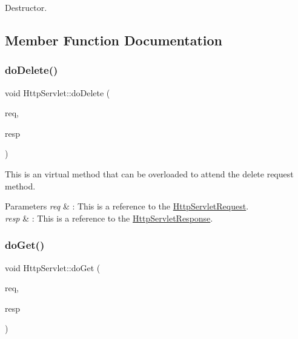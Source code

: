 Destructor. 



\subsection{Member Function Documentation}
\mbox{\label{class_http_servlet_a773a855260ff0977ae4c4a861008092c}} 
\subsubsection{\texorpdfstring{do\+Delete()}{doDelete()}}
{\footnotesize\ttfamily void Http\+Servlet\+::do\+Delete (\begin{DoxyParamCaption}\item[{\hyperlink{class_http_servlet_request}{Http\+Servlet\+Request} \&}]{req,  }\item[{\hyperlink{class_http_servlet_response}{Http\+Servlet\+Response} \&}]{resp }\end{DoxyParamCaption})\hspace{0.3cm}{\ttfamily [virtual]}}



This is an virtual method that can be overloaded to attend the delete request method. 


\begin{DoxyParams}{Parameters}
{\em req} & \+: This is a reference to the \hyperlink{class_http_servlet_request}{Http\+Servlet\+Request}. \\
\hline
{\em resp} & \+: This is a reference to the \hyperlink{class_http_servlet_response}{Http\+Servlet\+Response}. \\
\hline
\end{DoxyParams}
\mbox{\label{class_http_servlet_a7c851e2989b7a61e5c8470b562690516}} 
\subsubsection{\texorpdfstring{do\+Get()}{doGet()}}
{\footnotesize\ttfamily void Http\+Servlet\+::do\+Get (\begin{DoxyParamCaption}\item[{\hyperlink{class_http_servlet_request}{Http\+Servlet\+Request} \&}]{req,  }\item[{\hyperlink{class_http_servlet_response}{Http\+Servlet\+Response} \&}]{resp }\end{DoxyParamCaption})\hspace{0.3cm}{\ttfamily [virtual]}}



